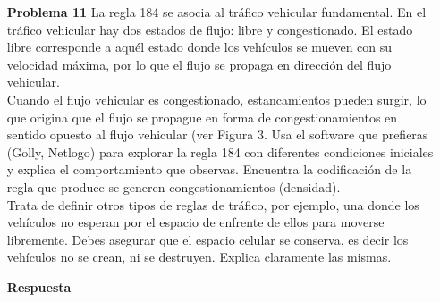 \documentclass{article}
\begin{document}
\begin{enumerate}
\begin{tabular}{c|c|c} %
  \hline
 \multicolumn{1}{|c|}{ }&\cellcolor{gray} & \multicolumn{1}{c|}{\cellcolor{gray}}  \\
  \hline
 & \cellcolor{gray} & \\
\cline{2-2}
\end{tabular}
\quad
\begin{tabular}{c|c|c}  %
  \hline
 \multicolumn{1}{|c|}{ }&\cellcolor{gray} & \multicolumn{1}{c|}{ }  \\
  \hline
 & \cellcolor{gray} & \\
\cline{2-2}
\end{tabular}
\quad
\begin{tabular}{c|c|c} %
  \hline
 \multicolumn{1}{|c|}{ }&  & \multicolumn{1}{c|}{\cellcolor{gray}}  \\
  \hline
 &  & \\
\cline{2-2}
\end{tabular}
\quad
\begin{tabular}{c|c|c}  %
  \hline
 \multicolumn{1}{|c|}{ }&  & \multicolumn{1}{c|}{ }  \\
  \hline
 & & \\
\cline{2-2}
\end{tabular}

\item[\bf{Problema 11}] La regla 184 se asocia al tráfico vehicular fundamental. En el tráfico vehicular hay dos estados de flujo: libre y congestionado. El estado libre corresponde a aquél estado donde los vehículos se mueven con su velocidad máxima, por lo que el flujo se propaga en dirección del flujo vehicular.\\Cuando el flujo vehicular es congestionado, estancamientos pueden surgir, lo que origina que el flujo se propague en forma de congestionamientos en sentido opuesto al flujo vehicular (ver Figura 3. Usa el software que prefieras (Golly, Netlogo) para explorar la regla 184 con diferentes condiciones iniciales y explica el comportamiento que observas. Encuentra la codificación de la regla que produce se generen congestionamientos (densidad).\\Trata de definir otros tipos de reglas de tráfico, por ejemplo, una donde los vehículos no esperan por el espacio de enfrente de ellos para moverse libremente. Debes asegurar que el espacio celular se conserva, es decir los vehículos no se crean, ni se destruyen. Explica claramente las mismas.

\item[\bf{Respuesta}] 


\end{enumerate}
\end{document}
